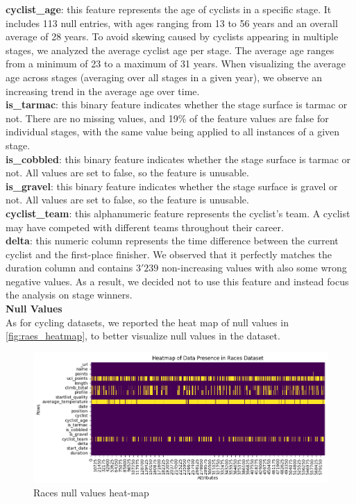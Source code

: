 \noindent \textbf{cyclist\_age}: this feature represents the age of cyclists in a specific stage. It includes 113 null entries, with ages ranging from 13 to 56 years and an overall average of 28 years. To avoid skewing caused by cyclists appearing in multiple stages, we analyzed the average cyclist age per stage. The average age ranges from a minimum of 23 to a maximum of 31 years. When visualizing the average age across stages (averaging over all stages in a given year), we observe an increasing trend in the average age over time.\\

\noindent \textbf{is\_tarmac}: this binary feature indicates whether the stage surface is tarmac or not. There are no missing values, and 19\% of the feature values are false for individual stages, with the same value being applied to all instances of a given stage. \\

\noindent \textbf{is\_cobbled}: this binary feature indicates whether the stage surface is tarmac or not. All values are set to false, so the feature is unusable. \\

\noindent \textbf{is\_gravel}: this binary feature indicates whether the stage surface is gravel or not. All values are set to false, so the feature is unusable.\\

\noindent \textbf{cyclist\_team}: this alphanumeric feature represents the cyclist's team. A cyclist may have competed with different teams throughout their career.\\

\noindent \textbf{delta}: this numeric column represents the time difference between the current cyclist and the first-place finisher. We observed that it perfectly matches the duration column and contains $3'239$ non-increasing values with also some wrong negative values. As a result, we decided not to use this feature and instead focus the analysis on stage winners.\\

\noindent
\textbf{Null Values}\\
As for cycling datasets, we reported the heat map of null values in \autoref{fig:raes_heatmap}, to better visualize null values in the dataset.

\begin{figure}[H]
    \centering
    \includegraphics[width=0.6\linewidth]{images//DU/heatmap_races.png}
    \caption{\small Races null values heat-map}
    \label{fig:raes_heatmap}
\end{figure}


